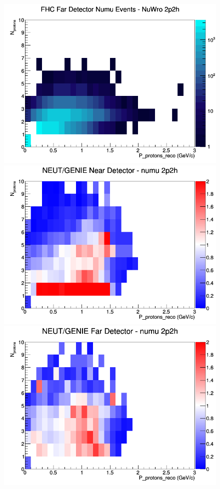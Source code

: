 \begin{figure}[h]
\endminipage
{}
\includegraphics[width=\linewidth]{eff_N_P/GAr/protons/2p2h_FHC_FD_numu_N_P_NuWro.png}
\endminipage
\newline
{}
\includegraphics[width=\linewidth]{eff_N_P/GAr/protons/ratios/2p2h_NEUT_GENIE_numu_near_N_P.png}
\endminipage
{}
\includegraphics[width=\linewidth]{eff_N_P/GAr/protons/ratios/2p2h_NEUT_GENIE_numu_far_N_P.png}

\end{figure}
